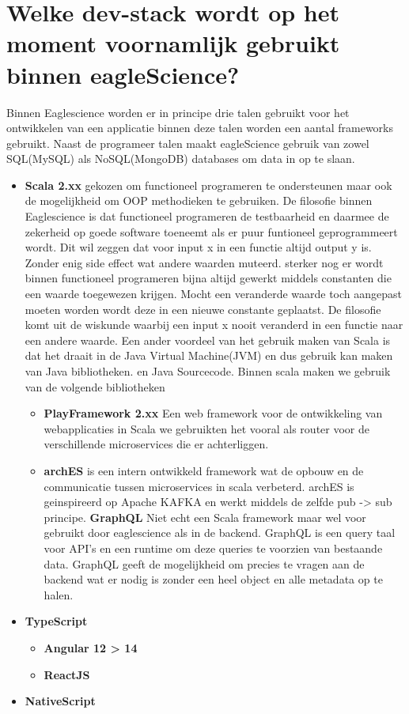 \section{Welke dev-stack wordt op het moment voornamlijk gebruikt binnen eagleScience?}

Binnen Eaglescience worden er in principe drie talen gebruikt voor het ontwikkelen van een applicatie binnen deze talen worden een aantal frameworks gebruikt. Naast de programeer talen maakt eagleScience gebruik van zowel SQL(MySQL) als NoSQL(MongoDB) databases om data in op te slaan.
\begin{itemize}
\item \textbf{Scala 2.xx} gekozen om functioneel programeren te ondersteunen maar ook de mogelijkheid om OOP methodieken te gebruiken. De filosofie binnen Eaglescience is dat functioneel programeren de testbaarheid en daarmee de zekerheid op goede software toeneemt als er puur funtioneel geprogrammeert wordt. Dit wil zeggen dat voor input x in een functie altijd output y is. Zonder enig side effect wat andere waarden muteerd. sterker nog er wordt binnen functioneel programeren bijna altijd gewerkt middels constanten die een waarde toegewezen krijgen. Mocht een veranderde waarde toch aangepast moeten worden wordt deze in een nieuwe constante geplaatst. De filosofie komt uit de wiskunde waarbij een input x nooit veranderd in een functie naar een andere waarde. Een ander voordeel van het gebruik maken van Scala is dat het draait in de Java Virtual Machine(JVM) en dus gebruik kan maken van Java bibliotheken. en Java Sourcecode. Binnen scala maken we gebruik van de volgende bibliotheken
\begin{itemize}
\item \textbf{PlayFramework 2.xx} Een web framework voor de ontwikkeling van webapplicaties in Scala we gebruikten het vooral als router voor de verschillende microservices die er achterliggen.
\item \textbf{archES} is een intern ontwikkeld framework wat de opbouw en de communicatie tussen microservices in scala verbeterd. archES is geinspireerd op Apache KAFKA en werkt middels de zelfde pub -> sub principe.
\iutem \textbf{GraphQL} Niet echt een Scala framework maar wel voor gebruikt door eaglescience als in de backend. GraphQL is een query taal voor API's en een runtime om deze queries te voorzien van bestaande data. GraphQL geeft de mogelijkheid om precies te vragen aan de backend wat er nodig is zonder een heel object en alle metadata op te halen.
\end{itemize}
\item \textbf{TypeScript}
\begin{itemize}
\item \textbf{Angular 12 > 14}
\item \textbf{ReactJS} 
\end{itemize}
\item \textbf{NativeScript}
\end{itemize}

